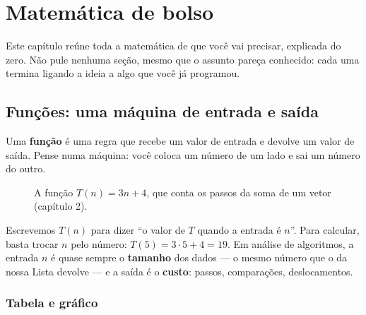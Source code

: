 \chapter{Matemática de bolso}\label{cap:03}

Este capítulo reúne toda a matemática de que você vai precisar, explicada do zero. Não pule
nenhuma seção, mesmo que o assunto pareça conhecido: cada uma termina ligando a ideia a algo que
você já programou.

\section{Funções: uma máquina de entrada e saída}

Uma \textbf{função} é uma regra que recebe um valor de entrada e devolve um valor de saída. Pense
numa máquina: você coloca um número de um lado e sai um número do outro.

\begin{figure}[!htb]
\centering
{}
\caption{A função $T(n) = 3n + 4$, que conta os passos da soma de um vetor (capítulo 2).}
\end{figure}

Escrevemos $T(n)$ para dizer \enquote{o valor de $T$ quando a entrada é $n$}. Para calcular, basta
trocar $n$ pelo número: $T(5) = 3 \cdot 5 + 4 = 19$. Em análise de algoritmos, a entrada $n$ é
quase sempre o \textbf{tamanho} dos dados — o mesmo número que o  da nossa Lista
devolve — e a saída é o \textbf{custo}: passos, comparações, deslocamentos.

\subsection{Tabela e gráfico}

